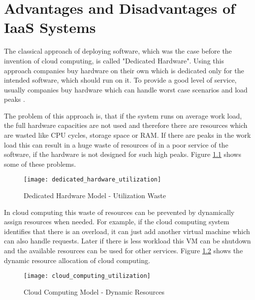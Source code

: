 \chapter{Advantages and Disadvantages of IaaS Systems}
\label{chap:advantages}

The classical approach of deploying software, which was the case before the invention of cloud computing, is called "Dedicated Hardware". Using this approach companies buy hardware on their own which is dedicated only for the intended software, which should run on it. To provide a good level of service, usually companies buy hardware which can handle worst case scenarios and load peaks \cite{Gajbhiye_2014}.

The problem of this approach is, that if the system runs on average work load, the full hardware capacities are not used and therefore there are resources which are wasted like CPU cycles, storage space or RAM. If there are peaks in the work load this can result in a huge waste of resources of in a poor service of the software, if the hardware is not designed for such high peaks. Figure \ref{fig:dedicated_hardware_utilization} shows some of these problems.

\begin{figure}[h!]
	\centering
		\texttt{[image: dedicated\_hardware\_utilization]}
	\caption{Dedicated Hardware Model - Utilization Waste \cite{Gajbhiye_2014}}
	\label{fig:dedicated_hardware_utilization}
\end{figure}

In cloud computing this waste of resources can be prevented by dynamically assign resources when needed. For example, if the cloud computing system identifies that there is an overload, it can just add another virtual machine which can also handle requests. Later if there is less workload this VM can be shutdown and the available resources can be used for other services. Figure \ref{fig:cloud_computing_utilization} shows the dynamic resource allocation of cloud computing.

\begin{figure}[h!]
	\centering
		\texttt{[image: cloud\_computing\_utilization]}
	\caption{Cloud Computing Model - Dynamic Resources \cite{Gajbhiye_2014}}
	\label{fig:cloud_computing_utilization}
\end{figure}